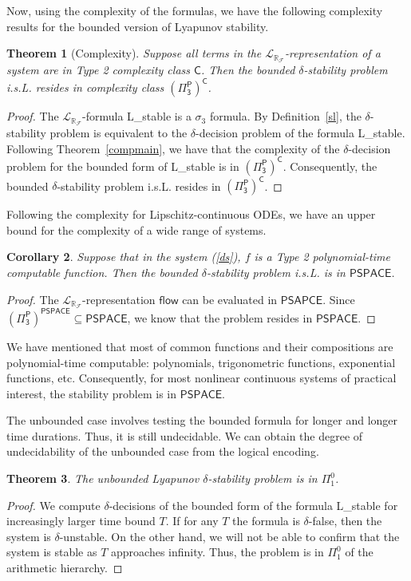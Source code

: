 \documentclass[10pt]{article}
\theoremstyle{plain}
\newtheorem{theorem}{Theorem}[section]
\newtheorem{corollary}[theorem]{Corollary}
\theoremstyle{definition}
\newcommand{\flow}{\mathsf{flow}}
\newcommand{\lrf}{\mathcal{L}_{\mathbb{R}_{\mathcal{F}}}}
\begin{document}
Now, using the complexity of the formulas, we have the following complexity results for the bounded version of Lyapunov stability. 
\begin{theorem}[Complexity]
Suppose all terms in the $\lrf$-representation of a system are in Type 2 complexity class $\mathsf{C}$.  Then the bounded $\delta$-stability problem i.s.L. resides in complexity class $\mathsf{(\Pi^P_3)^C}$. 
\end{theorem}
\begin{proof}
The $\lrf$-formula {\sf L\_stable} is a $\sigma_3$ formula. By Definition~\ref{sl}, the $\delta$-stability problem is equivalent to the $\delta$-decision problem of the formula {\sf L\_stable}.  Following Theorem~\ref{compmain}, we have that the complexity of the $\delta$-decision problem for the bounded form of {\sf L\_stable} is in $\mathsf{(\Pi^P_3)^C}$. Consequently, the bounded $\delta$-stability problem i.s.L. resides in $\mathsf{(\Pi^P_3)^C}$. 
\end{proof}

Following the complexity for Lipschitz-continuous ODEs, we have an upper bound for the complexity of a wide range of systems. 
\begin{corollary}
Suppose that in the system (\ref{ds}), $f$ is a Type 2 polynomial-time computable function. Then the bounded $\delta$-stability problem i.s.L. is in $\mathsf{PSPACE}$.  
\end{corollary}
\begin{proof}
The $\lrf$-representation $\flow$ can be evaluated in $\mathsf{PSAPCE}$. Since $\mathsf{(\Pi^P_3)^{PSPACE}} \subseteq \mathsf{PSPACE}$, we know that the problem resides in $\mathsf{PSPACE}$. 
\end{proof}
We have mentioned that most of common functions and their compositions are polynomial-time computable: polynomials, trigonometric functions, exponential functions, etc. Consequently, for most nonlinear continuous systems of practical interest, the stability problem is in $\mathsf{PSPACE}$. 

The unbounded case involves testing the bounded formula for longer and longer time durations. Thus, it is still undecidable. We can obtain the degree of undecidability of the unbounded case from the logical encoding. 
\begin{theorem}
The unbounded Lyapunov $\delta$-stability problem is in $\Pi^0_1$. 
\end{theorem}
\begin{proof}
We compute $\delta$-decisions of the bounded form of the formula {\sf L\_stable} for increasingly larger time bound $T$. If for any $T$ the formula is $\delta$-false, then the system is $\delta$-unstable. On the other hand, we will not be able to confirm that the system is stable as $T$ approaches infinity. Thus, the problem is in $\Pi^0_1$ of the arithmetic hierarchy. \end{proof}
\end{document}
